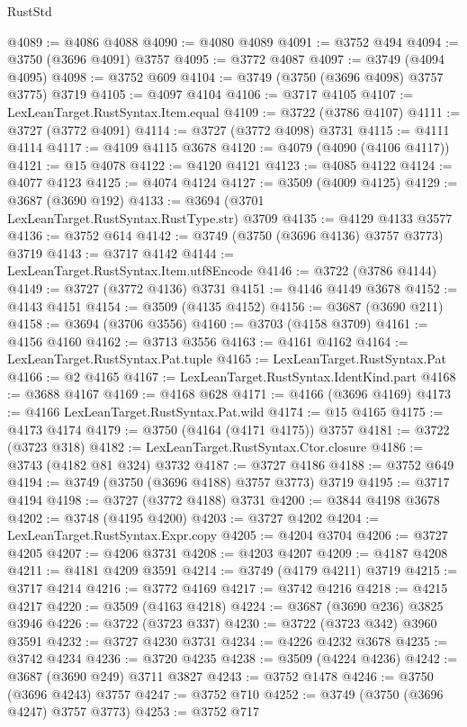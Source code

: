 \begin{lexlean}{RustStd}
\begin{coremodule}
@4089 := @4086 @4088
@4090 := @4080 @4089
@4091 := @3752 @494
@4094 := @3750 (@3696 @4091) @3757
@4095 := @3772 @4087
@4097 := @3749 (@4094 @4095)
@4098 := @3752 @609
@4104 := @3749 (@3750 (@3696 @4098) @3757 @3775) @3719
@4105 := @4097 @4104
@4106 := @3717 @4105
@4107 := LexLeanTarget.RustSyntax.Item.equal
@4109 := @3722 (@3786 @4107)
@4111 := @3727 (@3772 @4091)
@4114 := @3727 (@3772 @4098) @3731
@4115 := @4111 @4114
@4117 := @4109 @4115 @3678
@4120 := @4079 (@4090 (@4106 @4117))
@4121 := @15 @4078
@4122 := @4120 @4121
@4123 := @4085 @4122
@4124 := @4077 @4123
@4125 := @4074 @4124
@4127 := @3509 (@4009 @4125)
@4129 := @3687 (@3690 @192)
@4133 := @3694 (@3701 LexLeanTarget.RustSyntax.RustType.str) @3709
@4135 := @4129 @4133 @3577
@4136 := @3752 @614
@4142 := @3749 (@3750 (@3696 @4136) @3757 @3773) @3719
@4143 := @3717 @4142
@4144 := LexLeanTarget.RustSyntax.Item.utf8Encode
@4146 := @3722 (@3786 @4144)
@4149 := @3727 (@3772 @4136) @3731
@4151 := @4146 @4149 @3678
@4152 := @4143 @4151
@4154 := @3509 (@4135 @4152)
@4156 := @3687 (@3690 @211)
@4158 := @3694 (@3706 @3556)
@4160 := @3703 (@4158 @3709)
@4161 := @4156 @4160
@4162 := @3713 @3556
@4163 := @4161 @4162
@4164 := LexLeanTarget.RustSyntax.Pat.tuple
@4165 := LexLeanTarget.RustSyntax.Pat
@4166 := @2 @4165
@4167 := LexLeanTarget.RustSyntax.IdentKind.part
@4168 := @3688 @4167
@4169 := @4168 @628
@4171 := @4166 (@3696 @4169)
@4173 := @4166 LexLeanTarget.RustSyntax.Pat.wild
@4174 := @15 @4165
@4175 := @4173 @4174
@4179 := @3750 (@4164 (@4171 @4175)) @3757
@4181 := @3722 (@3723 @318)
@4182 := LexLeanTarget.RustSyntax.Ctor.closure
@4186 := @3743 (@4182 @81 @324) @3732
@4187 := @3727 @4186
@4188 := @3752 @649
@4194 := @3749 (@3750 (@3696 @4188) @3757 @3773) @3719
@4195 := @3717 @4194
@4198 := @3727 (@3772 @4188) @3731
@4200 := @3844 @4198 @3678
@4202 := @3748 (@4195 @4200)
@4203 := @3727 @4202
@4204 := LexLeanTarget.RustSyntax.Expr.copy
@4205 := @4204 @3704
@4206 := @3727 @4205
@4207 := @4206 @3731
@4208 := @4203 @4207
@4209 := @4187 @4208
@4211 := @4181 @4209 @3591
@4214 := @3749 (@4179 @4211) @3719
@4215 := @3717 @4214
@4216 := @3772 @4169
@4217 := @3742 @4216
@4218 := @4215 @4217
@4220 := @3509 (@4163 @4218)
@4224 := @3687 (@3690 @236) @3825 @3946
@4226 := @3722 (@3723 @337)
@4230 := @3722 (@3723 @342) @3960 @3591
@4232 := @3727 @4230 @3731
@4234 := @4226 @4232 @3678
@4235 := @3742 @4234
@4236 := @3720 @4235
@4238 := @3509 (@4224 @4236)
@4242 := @3687 (@3690 @249) @3711 @3827
@4243 := @3752 @1478
@4246 := @3750 (@3696 @4243) @3757
@4247 := @3752 @710
@4252 := @3749 (@3750 (@3696 @4247) @3757 @3773)
@4253 := @3752 @717

\end{coremodule}
\end{lexlean}
